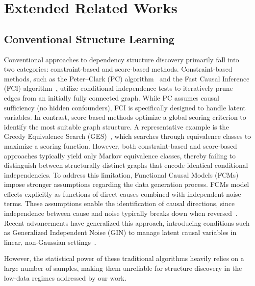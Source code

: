\appendix

\section{Extended Related Works}
\subsection{Conventional Structure Learning}

Conventional approaches to dependency structure discovery primarily fall into two categories: constraint-based and score-based methods. Constraint-based methods, such as the Peter–Clark (PC) algorithm~\cite{spirtes2000causation} and the Fast Causal Inference (FCI) algorithm~\cite{spirtes1995causal}, utilize conditional independence tests to iteratively prune edges from an initially fully connected graph. While PC assumes causal sufficiency (no hidden confounders), FCI is specifically designed to handle latent variables. In contrast, score-based methods optimize a global scoring criterion to identify the most suitable graph structure. A representative example is the Greedy Equivalence Search (GES)~\cite{chickering2002optimal}, which searches through equivalence classes to maximize a scoring function. However, both constraint-based and score-based approaches typically yield only Markov equivalence classes, thereby failing to distinguish between structurally distinct graphs that encode identical conditional independencies. To address this limitation, Functional Causal Models (FCMs) impose stronger assumptions regarding the data generation process. FCMs model effects explicitly as functions of direct causes combined with independent noise terms. These assumptions enable the identification of causal directions, since independence between cause and noise typically breaks down when reversed~\cite{shimizu2006linear, hoyer2008nonlinear, zhang2009identifiability}. Recent advancements have generalized this approach, introducing conditions such as Generalized Independent Noise (GIN) to manage latent causal variables in linear, non-Gaussian settings~\cite{xie2020generalized}. 

However, the statistical power of these traditional algorithms heavily relies on a large number of samples, making them unreliable for structure discovery in the low-data regimes addressed by our work.

